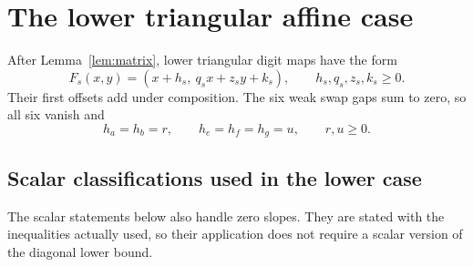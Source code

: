 \documentclass[11pt,a4paper]{article}
\begin{document}
\section{The lower triangular affine case}
After Lemma~\ref{lem:matrix}, lower triangular digit maps have the form
\begin{equation}\label{eq:lower}
F_s(x,y)=(x+h_s,\ q_sx+z_sy+k_s),\qquad h_s,q_s,z_s,k_s\ge0.
\end{equation}
Their first offsets add under composition. The six weak swap gaps sum
to zero, so all six vanish and
\begin{equation}\label{eq:twooffsets}
h_a=h_b=r,\qquad h_e=h_f=h_g=u,\qquad r,u\ge0.
\end{equation}

\subsection{Scalar classifications used in the lower case}
The scalar statements below also handle zero slopes. They are stated
with the inequalities actually used, so their application does not
require a scalar version of the diagonal lower bound.
\end{document}
